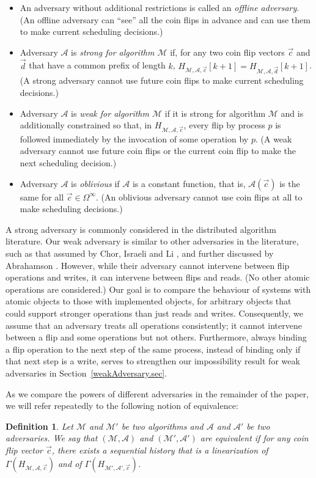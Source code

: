 \documentclass[11pt,letterpaper]{article}
\newtheorem{definition}[theorem]{Definition}
\renewcommand{\AA}{\mathcal{A}}
\newcommand{\MM}{\mathcal{M}}
\newcommand{\vc}{{\vec{c}}}
\newcommand{\vd}{{\vec{d}}}
\begin{document}
\vspace{-2pt}
\begin{itemize}
\setlength{\itemsep}{-2.8pt}
\item
An adversary without additional restrictions is called an \emph{offline adversary}.
(An offline adversary can ``see'' all the coin flips in advance and can use them to make current scheduling decisions.)
\item
Adversary $\AA$ is \emph{strong for algorithm $\MM$}
if, for any two coin flip vectors $\vc$ and $\vec{d}$ that have a common prefix of length $k$,
 $H_{\MM,\AA,\vc}[k+1]=H_{\MM,\AA,\vd}[k+1]$.
(A strong adversary cannot use future coin flips to make current scheduling decisions.)
\item
Adversary $\AA$ is \emph{weak for algorithm $\MM$}
if it is  strong for algorithm $\MM$ and is additionally constrained so that,
in $H_{\MM,\AA,\vc}$, every flip by process $p$ is followed immediately by the invocation of some operation by $p$.
(A weak adversary cannot use future coin flips or the current coin flip to make the next scheduling decision.)
\item
Adversary $\AA$ is \emph{oblivious} if $\AA$ is a constant function, that is, $\AA(\vc)$ is the same for all $\vc\in\Omega^\infty$.
(An oblivious adversary cannot use coin flips at all to make scheduling decisions.)
\end{itemize}

A strong adversary is commonly considered in the distributed algorithm literature.
Our weak adversary is similar to other adversaries in the literature,
such as that assumed by Chor, Israeli and Li \cite{CIL1987_PODC},
and further discussed by Abrahamson \cite{Abrahamson88_PODC}.
However, while their adversary cannot intervene between flip operations and writes,
it can intervene between flips and reads. (No other atomic operations are considered.)
Our goal is to compare the behaviour of systems with atomic objects to those with implemented objects,
for arbitrary objects that could support stronger operations than just reads and writes.
Consequently, we assume that an adversary treats all operations consistently;
it cannot intervene between a flip and some operations but not others.
Furthermore, always binding a flip operation to the next step of the same process,
instead of binding only if that next step is a write,
serves to strengthen our impossibility result for weak adversaries in Section~\ref{weakAdversary.sec}.

As we compare the powers of different adversaries in the remainder of the paper,
we will refer repeatedly to the following notion of equivalence:
\begin{definition}\label{def_advequiv}
  Let $\MM$ and $\MM'$ be two algorithms and $\AA$ and $\AA'$ be two adversaries.
  We say that $(\MM,\AA)$ and $(\MM',\AA')$ are \emph{equivalent}
  if for any coin flip vector $\vc$,
  there exists a sequential history that is a linearization of $\Gamma(H_{\MM,\AA,\vc})$ and
  of $\Gamma(H_{\MM',\AA',\vc})$.
\end{definition}
\end{document}
